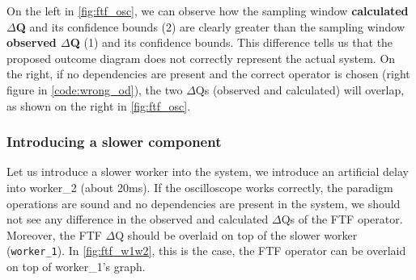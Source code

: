             On the left in \cref{fig:ftf_osc}, we can observe how the sampling window \textbf{calculated $\Delta$Q} and its confidence bounds (2) are clearly greater than the sampling window \textbf{observed $\Delta$Q} (1) and its confidence bounds. This difference tells us that the proposed outcome diagram does not correctly represent the actual system. On the right, if no dependencies are present and the correct operator is chosen (right figure in \cref{code:wrong_od}), the two $\Delta$Qs (observed and calculated) will overlap, as shown on the right in \cref{fig:ftf_osc}.

                  \subsubsection{Introducing a slower component}
            Let us introduce a slower worker into the system, we introduce an artificial delay into worker\_2 (about 20ms). If the oscilloscope works correctly, the paradigm operations are sound and no dependencies are present in the system, we should not see any difference in the observed and calculated $\Delta$Qs of the FTF operator. Moreover, the FTF $\Delta$Q should be overlaid on top of the slower worker (\texttt{worker\_1}). In \cref{fig:ftf_w1w2}, this is the case, the FTF operator can be overlaid on top of worker\_1's graph. 

